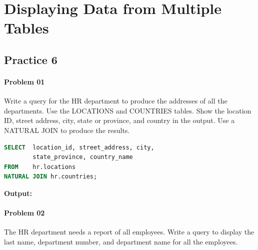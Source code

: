 \chapter{Displaying Data from Multiple Tables}

\section{\textbf{Practice 6}}

\subsubsection*{Problem 01}
Write a query for the HR department to produce the addresses of all the departments. Use the LOCATIONS and COUNTRIES tables. Show the location ID, street address, city, state or province, and country in the output. Use a NATURAL JOIN to produce the results.

\begin{frame}



\begin{lstlisting}[language=SQL]
SELECT 	location_id, street_address, city, 
    	state_province, country_name
FROM	hr.locations
NATURAL JOIN hr.countries;
\end{lstlisting}
\textbf{Output: }
\end{frame}


\newpage
\subsubsection*{Problem 02}
The HR department needs a report of all employees. Write a query to display the last name, department number, and department name for all the employees.

